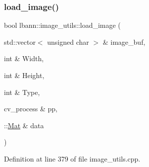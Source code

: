 \subsubsection{\texorpdfstring{load\+\_\+image()}{load\_image()}\hspace{0.1cm}{\footnotesize\ttfamily [2/5]}}
{\footnotesize\ttfamily bool lbann\+::image\+\_\+utils\+::load\+\_\+image (\begin{DoxyParamCaption}\item[{std\+::vector$<$ unsigned char $>$ \&}]{image\+\_\+buf,  }\item[{int \&}]{Width,  }\item[{int \&}]{Height,  }\item[{int \&}]{Type,  }\item[{cv\+\_\+process \&}]{pp,  }\item[{\+::\hyperlink{base_8hpp_a68f11fdc31b62516cb310831bbe54d73}{Mat} \&}]{data }\end{DoxyParamCaption})\hspace{0.3cm}{\ttfamily [static]}}



Definition at line 379 of file image\+\_\+utils.\+cpp.


